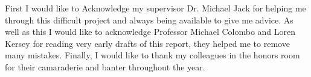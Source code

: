 First I would like to Acknowledge my supervisor Dr. Michael Jack for helping me through this difficult project and always being available to give me advice. As well as this I would like to acknowledge Professor Michael Colombo and Loren Kersey for reading very early drafts of this report, they helped me to remove many mistakes. Finally, I would like to thank my colleagues in the honors room for their camaraderie and banter throughout the year.